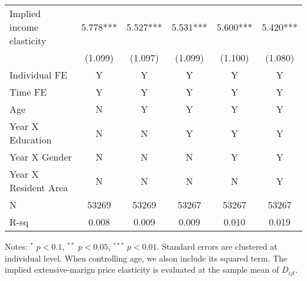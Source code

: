 \documentclass[ review  , 3p ]{elsarticle}
\begin{document}
\begin{table}
\begin{threeparttable}
\begin{tabular}[t]{lccccc}
  \hspace{1em}Implied income elasticity & 5.778*** & 5.527*** & 5.531*** & 5.600*** & 5.420***\\
  \hspace{1em} & (1.099) & (1.097) & (1.099) & (1.100) & (1.080)\\
  \hspace{1em}Individual FE & Y & Y & Y & Y & Y\\
  \hspace{1em}Time FE & Y & Y & Y & Y & Y\\
  \hspace{1em}Age & N & Y & Y & Y & Y\\
  \hspace{1em}Year X Education & N & N & Y & Y & Y\\
  \hspace{1em}Year X Gender & N & N & N & Y & Y\\
  \hspace{1em}Year X Resident Area & N & N & N & N & Y\\
  \hspace{1em}N & 53269 & 53269 & 53267 & 53267 & 53267\\
  \hspace{1em}R-sq & 0.008 & 0.009 & 0.009 & 0.010 & 0.019\\
  \bottomrule
  \end{tabular}
  \begin{tablenotes}
  \item Notes: $^{*}$ $p < 0.1$, $^{**}$ $p < 0.05$, $^{***}$ $p < 0.01$. Standard errors are clustered at individual level. When controlling age, we alson include its squared term. The implied extensive-marign price elasticity is evaluated at the sample mean of $D_{ijt}$.
  \end{tablenotes}
  \end{threeparttable}
  \end{table}
  
\end{document}
